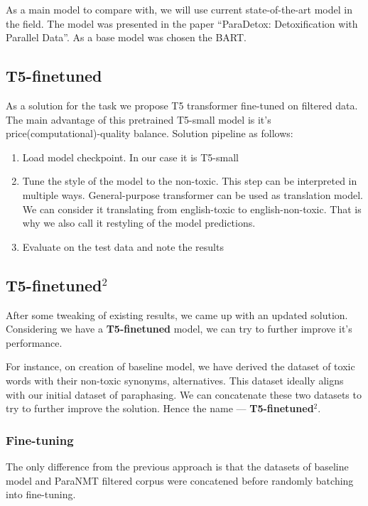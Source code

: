 As a main model to compare with, we will use current state-of-the-art model in
the field. The model was presented in the paper ``ParaDetox: Detoxification
with Parallel Data''. As a base model was chosen the BART.

\subsection{T5-finetuned}

As a solution for the task we propose T5 transformer fine-tuned on filtered
data. The main advantage of this pretrained T5-small model is it's
price(computational)-quality balance. Solution pipeline as follows:

\begin{enumerate}
      \item Load model checkpoint. In our case it is T5-small

      \item

            Tune the style of the model to the non-toxic. This step can be interpreted in
            multiple ways. General-purpose transformer can be used as translation model. We
            can consider it translating from english-toxic to english-non-toxic. That is
            why we also call it restyling of the model predictions.

      \item Evaluate on the test data and note the results
\end{enumerate}

\subsection{T5-finetuned\(^2\)}

After some tweaking of existing results, we came up with an updated solution.
Considering we have a \textbf{T5-finetuned} model, we can try to further
improve it's performance.

For instance, on creation of baseline model, we have derived the dataset of
toxic words with their non-toxic synonyms, alternatives. This dataset ideally
aligns with our initial dataset of paraphasing. We can concatenate these two
datasets to try to further improve the solution. Hence the name ---
\textbf{T5-finetuned\(^2\)}.

\subsubsection{Fine-tuning}

The only difference from the previous approach is that the datasets of baseline
model and ParaNMT filtered corpus were concatened before randomly batching into
fine-tuning.